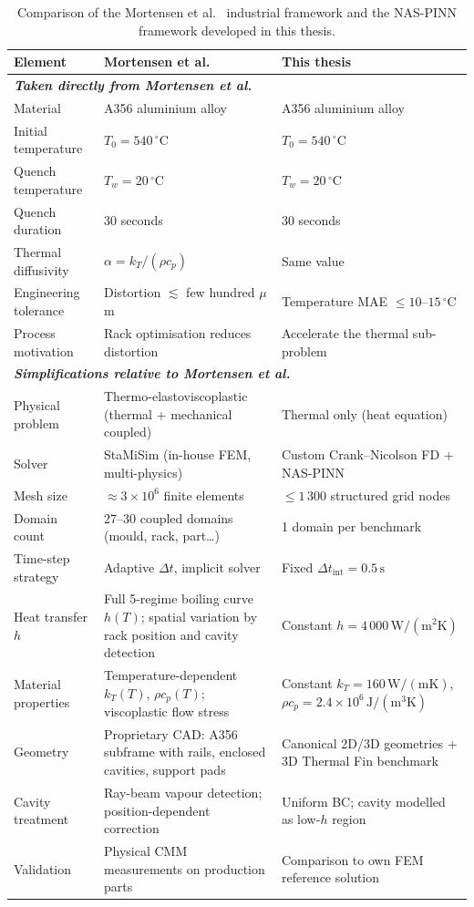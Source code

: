 \begin{table}[H]
\centering
\caption{Comparison of the Mortensen et al.~\cite{mortensen2026} industrial
framework and the NAS-PINN framework developed in this thesis.}
\label{tab:mortensen_comparison}
\small
\begin{tabular}{p{3.8cm}p{5.0cm}p{5.0cm}}
\toprule
\textbf{Element} & \textbf{Mortensen et al.~\cite{mortensen2026}} & \textbf{This thesis} \\
\midrule
\multicolumn{3}{l}{\textit{\textbf{Taken directly from Mortensen et al.}}} \\
\midrule
Material & A356 aluminium alloy & A356 aluminium alloy \\
Initial temperature & $T_0 = 540\,^\circ\mathrm{C}$ & $T_0 = 540\,^\circ\mathrm{C}$ \\
Quench temperature & $T_w = 20\,^\circ\mathrm{C}$ & $T_w = 20\,^\circ\mathrm{C}$ \\
Quench duration & 30 seconds & 30 seconds \\
Thermal diffusivity & $\alpha = k_T/(\rho c_p)$ & Same value \\
Engineering tolerance & Distortion $\lesssim$ few hundred $\mu$m & Temperature MAE $\leq 10$--$15\,^\circ\mathrm{C}$ \\
Process motivation & Rack optimisation reduces distortion & Accelerate the thermal sub-problem \\
\midrule
\multicolumn{3}{l}{\textit{\textbf{Simplifications relative to Mortensen et al.}}} \\
\midrule
Physical problem & Thermo-elastoviscoplastic (thermal + mechanical coupled) & Thermal only (heat equation) \\
Solver & StaMiSim (in-house FEM, multi-physics) & Custom Crank--Nicolson FD + NAS-PINN \\
Mesh size & $\approx 3\times10^6$ finite elements & $\leq 1\,300$ structured grid nodes \\
Domain count & 27--30 coupled domains (mould, rack, part\ldots) & 1 domain per benchmark \\
Time-step strategy & Adaptive $\Delta t$, implicit solver & Fixed $\Delta t_\mathrm{int}=0.5\,\mathrm{s}$ \\
Heat transfer $h$ & Full 5-regime boiling curve $h(T)$; spatial variation by rack position and cavity detection & Constant $h = 4\,000\,\mathrm{W/(m^2K)}$ \\
Material properties & Temperature-dependent $k_T(T)$, $\rho c_p(T)$; viscoplastic flow stress & Constant $k_T = 160\,\mathrm{W/(mK)}$, $\rho c_p = 2.4\times10^6\,\mathrm{J/(m^3K)}$ \\
Geometry & Proprietary CAD: A356 subframe with rails, enclosed cavities, support pads & Canonical 2D/3D geometries + 3D Thermal Fin benchmark \\
Cavity treatment & Ray-beam vapour detection; position-dependent correction & Uniform BC; cavity modelled as low-$h$ region \\
Validation & Physical CMM measurements on production parts & Comparison to own FEM reference solution \\
\bottomrule
\end{tabular}
\end{table}

